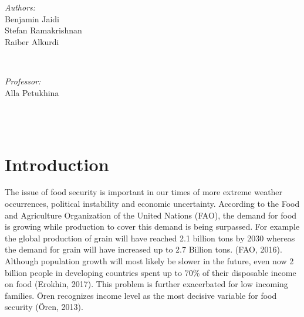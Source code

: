 \documentclass[11pt]{article}
\makeatletter
\let\thedate\@date
\makeatother
\begin{document}
\begin{titlepage}
\begin{minipage}{0.4\textwidth}
\begin{flushleft}
	\begin{center}
	\emph{Authors:}\\
            Benjamin Jaidi \\
	Stefan Ramakrishnan \\
	Raiber Alkurdi
\end{center}
            \end{flushleft}
            \end{minipage}~
            \begin{minipage}{0.4\textwidth}
            \begin{flushright} \large
	\begin{center}
            \emph{Professor:} \\
	Alla Petukhina       
\end{center}                           
        \end{flushright}
    \end{minipage}\\[2 cm]
    
    {\large \thedate}\\[2 cm]
        
	
	\date{\today} 
        
\end{titlepage}


\tableofcontents
\pagebreak




\section{Introduction}

The issue of food security is important in our times of more extreme weather occurrences, political instability and economic uncertainty. According to the Food and Agriculture Organization of the United Nations (FAO), the demand for food is growing while production to cover this demand is being surpassed. For example the global production of grain will have reached 2.1 billion  tons by 2030 whereas the demand for grain will have increased up to 2.7 Billion tons. (FAO, 2016). Although population growth will most likely be slower in the future, even now 2 billion people in developing countries spent up to 70\% of their disposable income on food (Erokhin, 2017). This problem is further exacerbated for low incoming families. {\"O}ren recognizes income level as the most decisive variable for food security ({\"O}ren, 2013).
\end{document}
